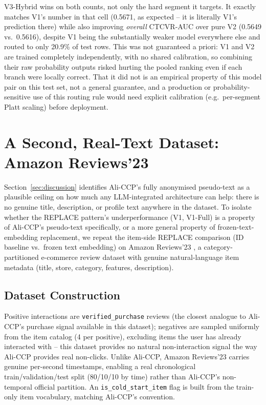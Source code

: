 V3-Hybrid wins on both counts, not only the hard segment it targets. It exactly matches V1's number in that cell (0.5671, as expected -- it is literally V1's prediction there) while also improving \emph{overall} CTCVR-AUC over pure V2 (0.5649 vs.\ 0.5616), despite V1 being the substantially weaker model everywhere else and routed to only 20.9\% of test rows. This was not guaranteed a priori: V1 and V2 are trained completely independently, with no shared calibration, so combining their raw probability outputs risked hurting the pooled ranking even if each branch were locally correct. That it did not is an empirical property of this model pair on this test set, not a general guarantee, and a production or probability-sensitive use of this routing rule would need explicit calibration (e.g.\ per-segment Platt scaling) before deployment.

\section{A Second, Real-Text Dataset: Amazon Reviews'23}
\label{sec:amazon}

Section~\ref{sec:discussion} identifies Ali-CCP's fully anonymised pseudo-text as a plausible ceiling on how much any LLM-integrated architecture can help: there is no genuine title, description, or profile text anywhere in the dataset. To isolate whether the REPLACE pattern's underperformance (V1, V1-Full) is a property of Ali-CCP's pseudo-text specifically, or a more general property of frozen-text-embedding replacement, we repeat the item-side REPLACE comparison (ID baseline vs.\ frozen text embedding) on Amazon Reviews'23 \cite{hou2024bridging}, a category-partitioned e-commerce review dataset with genuine natural-language item metadata (title, store, category, features, description).

\subsection{Dataset Construction}

Positive interactions are \texttt{verified\_purchase} reviews (the closest analogue to Ali-CCP's purchase signal available in this dataset); negatives are sampled uniformly from the item catalog (4 per positive), excluding items the user has already interacted with -- this dataset provides no natural non-interaction signal the way Ali-CCP provides real non-clicks. Unlike Ali-CCP, Amazon Reviews'23 carries genuine per-second timestamps, enabling a real chronological train/validation/test split (80/10/10 by time) rather than Ali-CCP's non-temporal official partition. An \texttt{is\_cold\_start\_item} flag is built from the train-only item vocabulary, matching Ali-CCP's convention.

